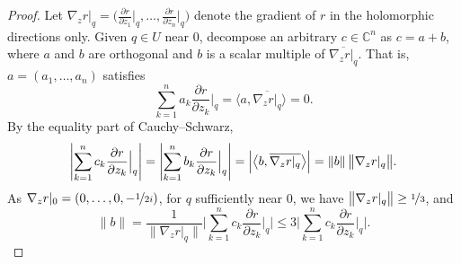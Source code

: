 \documentclass[12pt,openany]{book}
\newcommand{\blinnprod}[2]{\bigl\langle #1 , #2 \bigr\rangle}
\newcommand{\snorm}[1]{\lVert {#1} \rVert}
\newcommand{\bnorm}[1]{\bigl\lVert {#1} \bigr\rVert}
\newcommand{\Babs}[1]{\Bigl\lvert {#1} \Bigr\rvert}
\newcommand{\BBabs}[1]{\Biggl\lvert {#1} \Biggr\rvert}
\newcommand{\abs}[1]{\left\lvert {#1} \right\rvert}
\newcommand{\C}{{\mathbb{C}}}
\theoremstyle{plain}
\theoremstyle{remark}
\theoremstyle{definition}
\theoremstyle{exercise}
\theoremstyle{example}
\begin{document}
\begin{proof}
Let $\nabla_z r|_q =
\bigl(
\frac{\partial r}{\partial z_1}\big|_q,\ldots,
\frac{\partial r}{\partial z_n}\big|_q \bigr)$ denote the gradient of $r$ in
the holomorphic directions only.
Given $q \in U$ near $0$,
decompose an arbitrary $c \in \C^n$ as $c = a+b$,
where $a$ and $b$ are
orthogonal and $b$ is a scalar multiple of
$\overline{\nabla_z r|_q}$.  That is,
$a = (a_1,\ldots,a_n)$ satisfies
\begin{equation*}
\sum_{k=1}^n
a_k \frac{\partial r}{\partial z_k} \Big|_q =
\blinnprod{a}{\overline{\nabla_z r|_q}}
=
0 .
\end{equation*}
By the equality part of Cauchy--Schwarz,
\begin{equation*}
\BBabs{\sum_{k=1}^n c_k \frac{\partial r}{\partial z_k} \Big|_q}
=
\BBabs{\sum_{k=1}^n b_k \frac{\partial r}{\partial z_k} \Big|_q}
=
\Babs{\blinnprod{b}{\overline{\nabla_z r|_q}}}
=
\snorm{b} \, \bnorm{\nabla_z r|_q} .
\end{equation*}
As $\nabla_z r|_0 = (0,\ldots,0,-\nicefrac{1}{2i})$, for $q$
sufficiently near $0$, we have
$\bnorm{\nabla_z r|_q} \geq \nicefrac{1}{3}$, and
\begin{equation} \label{eq:25boundingb}
\snorm{b} =
\frac{1}{\bnorm
{\nabla_z r|_q}}
\BBabs{\sum_{k=1}^n c_k \frac{\partial r}{\partial z_k} \Big|_q}
\leq
3 \BBabs{\sum_{k=1}^n c_k \frac{\partial r}{\partial z_k} \Big|_q}
.
\end{equation}



\end{proof}
\end{document}
